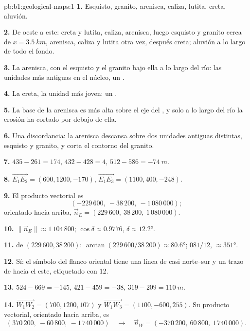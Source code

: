 \begin{solution}{pb:b1:geological-maps:1}
\textbf{1.} Esquisto, granito, arenisca, caliza, lutita, creta, aluvión.

\textbf{2.} De oeste a este: creta y lutita, caliza, arenisca, luego esquisto y granito cerca de
$x = \qty{3.5}{km}$, arenisca, caliza y lutita otra vez, después creta; aluvión a lo largo de todo
el fondo.

\textbf{3.} La arenisca, con el esquisto y el granito bajo ella a lo largo del río: las unidades más
antiguas en el núcleo, un .

\textbf{4.} La creta, la unidad más joven: un .

\textbf{5.} La base de la arenisca es más alta sobre el eje del , y solo a lo largo del río
la erosión ha cortado por debajo de ella.

\textbf{6.} Una discordancia: la arenisca descansa sobre dos unidades antiguas distintas, esquisto y
granito, y corta el contorno del granito.

\textbf{7.} $435 - 261 = 174$, $432 - 428 = 4$, $512 - 586 = \qty{-74}{m}$.

\textbf{8.} $\overrightarrow{E_1E_2} = (600, 1200, -170)$,
$\overrightarrow{E_1E_3} = (1100, 400, -248)$.

\textbf{9.} El producto vectorial es
\[
  (-229\,600,\ -38\,200,\ -1\,080\,000);
\]
orientado hacia arriba, $\vec n_E = (229\,600,\ 38\,200,\ 1\,080\,000)$.

\textbf{10.} $\|\vec n_E\| \approx 1\,104\,800$; $\cos\delta \approx 0.9776$,
$\delta \approx \ang{12.2}$.

\textbf{11.}  de $(229\,600, 38\,200)$: $\arctan(229\,600/38\,200)
\approx \ang{80.6}$;  $081/12$,  $\approx \ang{351}$.

\textbf{12.} Sí: el símbolo del flanco oriental tiene una línea de  casi norte--sur y un trazo
de  hacia el este, etiquetado con 12.

\textbf{13.} $524 - 669 = -145$, $421 - 459 = -38$, $319 - 209 =
\qty{110}{m}$.

\textbf{14.} $\overrightarrow{W_1W_2} = (700, 1200, 107)$ y
$\overrightarrow{W_1W_3} = (1100, -600, 255)$. Su producto vectorial, orientado hacia arriba, es
\[
  (370\,200,\ -60\,800,\ -1\,740\,000) \quad\longrightarrow\quad
  \vec n_W = (-370\,200,\ 60\,800,\ 1\,740\,000).
\]


\end{solution}

